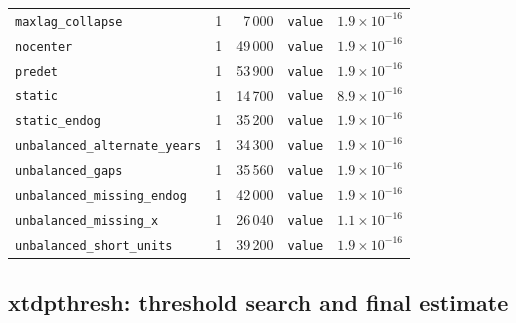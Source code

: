 \documentclass[10.5pt,a4paper]{article}
\begin{document}
\begin{longtable}{@{}p{3.6cm}rrp{4.9cm}r@{}}
\texttt{maxlag\_\allowbreak{}collapse} & 1 & 7\,000 & \texttt{value} & $1.9\times10^{-16}$ \\
\texttt{nocenter} & 1 & 49\,000 & \texttt{value} & $1.9\times10^{-16}$ \\
\texttt{predet} & 1 & 53\,900 & \texttt{value} & $1.9\times10^{-16}$ \\
\texttt{static} & 1 & 14\,700 & \texttt{value} & $8.9\times10^{-16}$ \\
\texttt{static\_\allowbreak{}endog} & 1 & 35\,200 & \texttt{value} & $1.9\times10^{-16}$ \\
\texttt{unbalanced\_\allowbreak{}alternate\_\allowbreak{}years} & 1 & 34\,300 & \texttt{value} & $1.9\times10^{-16}$ \\
\texttt{unbalanced\_\allowbreak{}gaps} & 1 & 35\,560 & \texttt{value} & $1.9\times10^{-16}$ \\
\texttt{unbalanced\_\allowbreak{}missing\_\allowbreak{}endog} & 1 & 42\,000 & \texttt{value} & $1.9\times10^{-16}$ \\
\texttt{unbalanced\_\allowbreak{}missing\_\allowbreak{}x} & 1 & 26\,040 & \texttt{value} & $1.1\times10^{-16}$ \\
\texttt{unbalanced\_\allowbreak{}short\_\allowbreak{}units} & 1 & 39\,200 & \texttt{value} & $1.9\times10^{-16}$ \\
\bottomrule
\end{longtable}

\subsection*{xtdpthresh: threshold search and final estimate}
\end{document}
